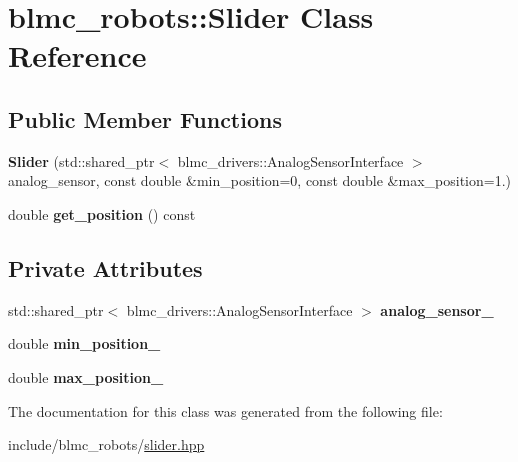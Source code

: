 \hypertarget{classblmc__robots_1_1Slider}{}\section{blmc\+\_\+robots\+:\+:Slider Class Reference}
\label{classblmc__robots_1_1Slider}
\subsection*{Public Member Functions}
\begin{DoxyCompactItemize}
\item 
\mbox{\label{classblmc__robots_1_1Slider_a4028fb3e3cb50932b8f73071fe39e9e9}} 
{\bfseries Slider} (std\+::shared\+\_\+ptr$<$ blmc\+\_\+drivers\+::\+Analog\+Sensor\+Interface $>$ analog\+\_\+sensor, const double \&min\+\_\+position=0, const double \&max\+\_\+position=1.)
\item 
\mbox{\label{classblmc__robots_1_1Slider_a43aeeb4c79e4884c167d5f58d16faac1}} 
double {\bfseries get\+\_\+position} () const
\end{DoxyCompactItemize}
\subsection*{Private Attributes}
\begin{DoxyCompactItemize}
\item 
\mbox{\label{classblmc__robots_1_1Slider_a88c34fec2815e94cefed9e050dcc229c}} 
std\+::shared\+\_\+ptr$<$ blmc\+\_\+drivers\+::\+Analog\+Sensor\+Interface $>$ {\bfseries analog\+\_\+sensor\+\_\+}
\item 
\mbox{\label{classblmc__robots_1_1Slider_af5cd281d0a74d037d34a6b4953e008d8}} 
double {\bfseries min\+\_\+position\+\_\+}
\item 
\mbox{\label{classblmc__robots_1_1Slider_a033fb1fb3301cb1e50a3939dcb766134}} 
double {\bfseries max\+\_\+position\+\_\+}
\end{DoxyCompactItemize}


The documentation for this class was generated from the following file\+:\begin{DoxyCompactItemize}
\item 
include/blmc\+\_\+robots/\hyperlink{slider_8hpp}{slider.\+hpp}\end{DoxyCompactItemize}
